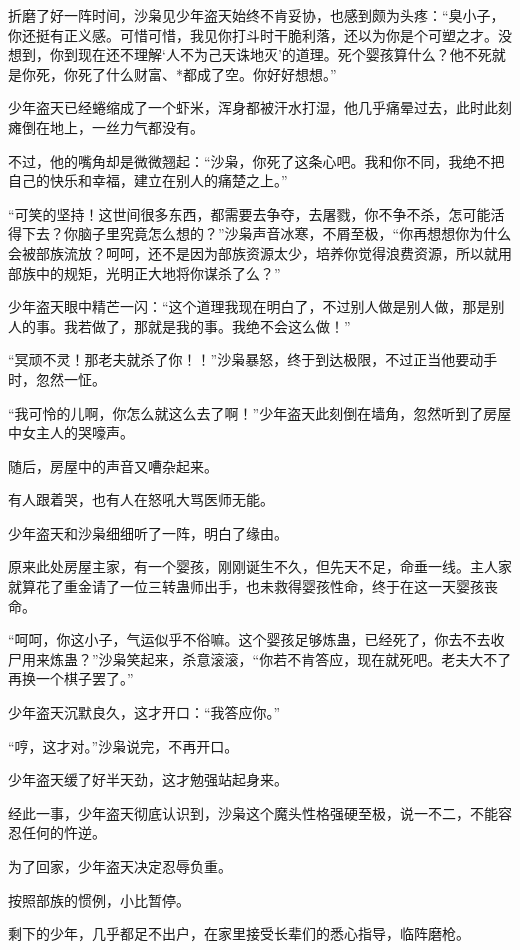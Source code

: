 \begin{this_body}
折磨了好一阵时间，沙枭见少年盗天始终不肯妥协，也感到颇为头疼：“臭小子，你还挺有正义感。可惜可惜，我见你打斗时干脆利落，还以为你是个可塑之才。没想到，你到现在还不理解‘人不为己天诛地灭’的道理。死个婴孩算什么？他不死就是你死，你死了什么财富、*都成了空。你好好想想。”

少年盗天已经蜷缩成了一个虾米，浑身都被汗水打湿，他几乎痛晕过去，此时此刻瘫倒在地上，一丝力气都没有。

不过，他的嘴角却是微微翘起：“沙枭，你死了这条心吧。我和你不同，我绝不把自己的快乐和幸福，建立在别人的痛楚之上。”

“可笑的坚持！这世间很多东西，都需要去争夺，去屠戮，你不争不杀，怎可能活得下去？你脑子里究竟怎么想的？”沙枭声音冰寒，不屑至极，“你再想想你为什么会被部族流放？呵呵，还不是因为部族资源太少，培养你觉得浪费资源，所以就用部族中的规矩，光明正大地将你谋杀了么？”

少年盗天眼中精芒一闪：“这个道理我现在明白了，不过别人做是别人做，那是别人的事。我若做了，那就是我的事。我绝不会这么做！”

“冥顽不灵！那老夫就杀了你！！”沙枭暴怒，终于到达极限，不过正当他要动手时，忽然一怔。

“我可怜的儿啊，你怎么就这么去了啊！”少年盗天此刻倒在墙角，忽然听到了房屋中女主人的哭嚎声。

随后，房屋中的声音又嘈杂起来。

有人跟着哭，也有人在怒吼大骂医师无能。

少年盗天和沙枭细细听了一阵，明白了缘由。

原来此处房屋主家，有一个婴孩，刚刚诞生不久，但先天不足，命垂一线。主人家就算花了重金请了一位三转蛊师出手，也未救得婴孩性命，终于在这一天婴孩丧命。

“呵呵，你这小子，气运似乎不俗嘛。这个婴孩足够炼蛊，已经死了，你去不去收尸用来炼蛊？”沙枭笑起来，杀意滚滚，“你若不肯答应，现在就死吧。老夫大不了再换一个棋子罢了。”

少年盗天沉默良久，这才开口：“我答应你。”

“哼，这才对。”沙枭说完，不再开口。

少年盗天缓了好半天劲，这才勉强站起身来。

经此一事，少年盗天彻底认识到，沙枭这个魔头性格强硬至极，说一不二，不能容忍任何的忤逆。

为了回家，少年盗天决定忍辱负重。

按照部族的惯例，小比暂停。

剩下的少年，几乎都足不出户，在家里接受长辈们的悉心指导，临阵磨枪。


\end{this_body}
